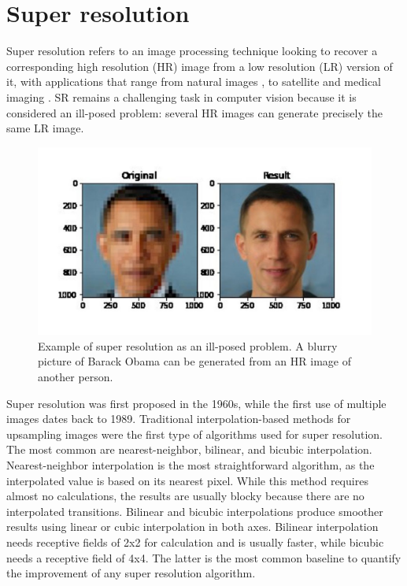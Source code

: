\section{Super resolution} \label{sec:SR}

    Super resolution refers to an image processing technique looking to recover a corresponding high resolution (HR) image from a low resolution (LR) version of it, with applications that range from natural images \cite{zeyde2010single}, \cite{martin2001database} to satellite \cite{valsesia2021permutation} and medical imaging \cite{bashir2021comprehensive}. SR remains a challenging task in computer vision because it is considered an ill-posed problem: several HR images can generate precisely the same LR image. 

       \begin{figure}[H]
            \centering
            \includegraphics[width=\textwidth]{Includes/2-SR-ill-posed.jpg}
            \caption{Example of super resolution as an ill-posed problem. A blurry picture of Barack Obama can be generated from an HR image of another person.}
            \label{fig:2-SR-ill-posed}
        \end{figure}
    
    Super resolution was first proposed in the 1960s, while the first use of multiple images dates back to 1989. 
    Traditional interpolation-based methods for upsampling images were the first type of algorithms used for super resolution.
    The most common are nearest-neighbor, bilinear, and bicubic interpolation.
    Nearest-neighbor interpolation is the most straightforward algorithm, as the interpolated value is based on its nearest pixel. 
    While this method requires almost no calculations, the results are usually blocky because there are no interpolated transitions.
    Bilinear and bicubic interpolations produce smoother results using linear or cubic interpolation in both axes. 
    Bilinear interpolation needs receptive fields of 2x2 for calculation and is usually faster, while bicubic needs a receptive field of 4x4. 
    The latter is the most common baseline to quantify the improvement of any super resolution algorithm. 

